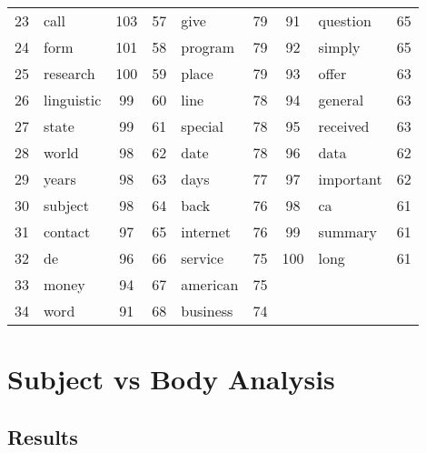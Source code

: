 \documentclass[10pt, a4paper]{article}
\begin{document}
\begin{table}[H]
\begin{tabular}{|c|l|c||c|l|c||c|l|c|}
23 & call & 103 & 57 & give & 79 & 91 & question & 65 \\
24 & form & 101 & 58 & program & 79 & 92 & simply & 65 \\
25 & research & 100 & 59 & place & 79 & 93 & offer & 63 \\
26 & linguistic & 99 & 60 & line & 78 & 94 & general & 63 \\
27 & state & 99 & 61 & special & 78 & 95 & received & 63 \\
28 & world & 98 & 62 & date & 78 & 96 & data & 62 \\
29 & years & 98 & 63 & days & 77 & 97 & important & 62 \\
30 & subject & 98 & 64 & back & 76 & 98 & ca & 61 \\
31 & contact & 97 & 65 & internet & 76 & 99 & summary & 61 \\
32 & de & 96 & 66 & service & 75 & 100 & long & 61 \\
33 & money & 94 & 67 & american & 75 &  &  &  \\
34 & word & 91 & 68 & business & 74 &  &  &  \\
\hline
\end{tabular}
\label{table:bodycorpus}
\end{table}

\section{Subject vs Body Analysis}

\subsection{Results}

\end{document}
